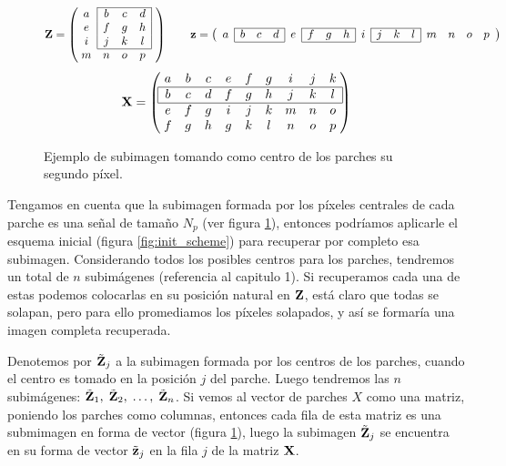 \begin{figure}[h]
	\[\Z = \left(
		\;\begin{matrix}
		\cline{2-4}
			a & \multicolumn{1}{|c}{b} & c & \multicolumn{1}{c|}{d}\\
			e & \multicolumn{1}{|c}{f} & g & \multicolumn{1}{c|}{h}\\
			i & \multicolumn{1}{|c}{j} & k & \multicolumn{1}{c|}{l}\\\cline{2-4}
			m & n & o & p\\
		\end{matrix}\;\;\;
	\right)
	\qquad\z = \left(
		\begin{array}{c|ccc|c|ccc|c|ccc|cccc}
			\cline{2-4}\cline{6-8}\cline{10-12}
			a & b & c & d & e & f & g & h & i & j & k & l & m & n & o & p \\
			\cline{2-4}\cline{6-8}\cline{10-12}
		\end{array}
	\right)
	\]
	\[
	\X = \left(
		\;\begin{matrix}
			a & b & c & e & f & g & i & j & k\\\hline
			\multicolumn{1}{|c}{b} & c & d & f & g & h & j & k & \multicolumn{1}{c|}{l}\\\hline
			e & f & g & i & j & k & m & n & o\\
			f & g & h & g & k & l & n & o & p\\
		\end{matrix}\;
	\right)
	\]
	\caption{Ejemplo de subimagen tomando como centro de los parches su segundo p\'ixel.}
	\label{ex:subimages}
\end{figure}

Tengamos en cuenta que la subimagen formada por los p\'ixeles centrales de cada parche es una señal de tamaño $N_p$ (ver figura \ref{ex:subimages}), entonces podr\'iamos aplicarle el esquema inicial (figura \ref{fig:init_scheme}) para recuperar por completo esa subimagen. Considerando todos los posibles centros para los parches, tendremos un total de $n$ subim\'agenes (referencia al capitulo 1). Si recuperamos cada una de estas podemos colocarlas en su posición natural en $\mathbf{Z}$, est\'a claro que todas se solapan, pero para ello promediamos los p\'ixeles solapados, y así se formar\'ia una imagen completa recuperada. 

Denotemos por $\tilde{\mathbf{Z}}_j$ a la subimagen formada por los centros de los parches, cuando el centro es tomado en la posici\'on $j$ del parche. Luego tendremos las $n$ subim\'agenes: $\tilde{\mathbf{Z}}_1,\; \tilde{\mathbf{Z}}_2,\; \dots,\; \tilde{\mathbf{Z}}_n$. Si vemos al vector de parches $X$ como una matriz, poniendo los parches como columnas, entonces cada fila de esta matriz es una submimagen en forma de vector (figura \ref{ex:subimages}), luego la subimagen $\tilde{\mathbf{Z}}_j$ se encuentra en su forma de vector $\tilde{\mathbf{z}}_j$ en la fila $j$ de la matriz $\mathbf{X}$.

